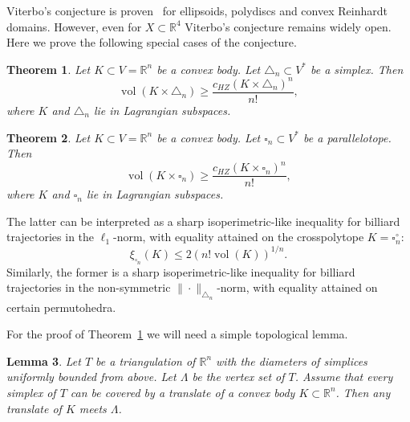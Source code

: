\documentclass[12pt,a4paper,oneside]{amsart}
\newtheorem{theorem}{Theorem}[section]
\newtheorem{lemma}[theorem]{Lemma}
\theoremstyle{definition}
\theoremstyle{remark}
\numberwithin{equation}{section}
\DeclareMathOperator{\volu}{vol}
\begin{document}
Viterbo's conjecture is proven~\cite{hermann1998non} for ellipsoids, polydiscs and convex Reinhardt domains. However, even for $X \subset \mathbb{R}^4$ Viterbo's conjecture remains widely open. Here we prove the following special cases of the conjecture.

\begin{theorem}
\label{thm:viterbosimplex}
Let $K \subset V = \mathbb{R}^n$ be a convex body. Let $\triangle_n \subset V^*$ be a simplex. Then
$$
\volu (K \times \triangle_n) \ge \frac{c_{HZ}(K \times \triangle_n)^n}{n!},
$$
where $K$ and $\triangle_n$ lie in Lagrangian subspaces.
\end{theorem}

\begin{theorem}
\label{thm:viterbocube}
Let $K \subset V = \mathbb{R}^n$ be a convex body. Let $\square_n \subset V^*$ be a parallelotope. Then
$$
\volu (K \times \square_n) \ge \frac{c_{HZ}(K \times \square_n)^n}{n!},
$$
where $K$ and $\square_n$ lie in Lagrangian subspaces.
\end{theorem}

The latter can be interpreted as a sharp isoperimetric-like inequality for billiard trajectories in the $\ell_1$-norm, with equality attained on the crosspolytope $K = \square_n^\circ$:
$$
\xi_{\square_n}(K) \le 2\left(n! \volu (K)\right)^{1/n}.
$$
Similarly, the former is a sharp isoperimetric-like inequality for billiard trajectories in the non-symmetric $\|\cdot\|_{\triangle_n}$-norm, with equality attained on certain permutohedra.

For the proof of Theorem~\ref{thm:viterbosimplex} we will need a simple topological lemma.

\begin{lemma}
\label{lem:avoidtriangulation}
Let $T$ be a triangulation of $\mathbb{R}^n$ with the diameters of simplices uniformly bounded from above. Let $\Lambda$ be the vertex set of $T$. Assume that every simplex of $T$ can be covered by a translate of a convex body $K \subset \mathbb{R}^n$. Then any translate of $K$ meets $\Lambda$.
\end{lemma}
\end{document}
